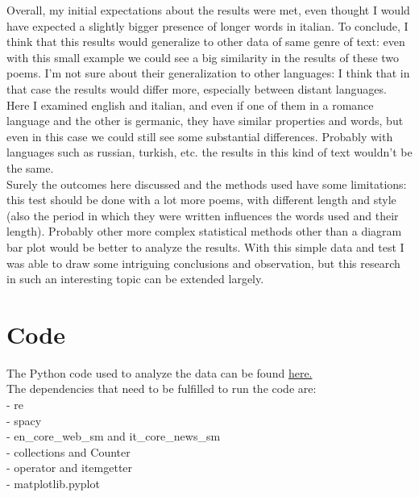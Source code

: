 Overall, my initial expectations about the results were met, even thought I would have expected a slightly bigger presence of longer words in italian. 
To conclude, I think that this results would generalize to other data of same genre of text: even with this small example we could see a  big similarity in the results of these two poems. 
I'm not sure about their generalization to other languages: I think that in that case the results would differ more, especially between distant languages. 
Here I examined english and italian, and even if one of them in a romance language and the other is germanic, they have similar properties and words, but even in this case we could still see some substantial differences. 
Probably with languages such as russian, turkish, etc. the results in this kind of text wouldn't be the same.\\
Surely the outcomes here discussed and the methods used have some limitations: this test should be done with a lot more poems, with different length and style (also the period in which they were written influences the words used and their length).
Probably other more complex statistical methods other than a diagram bar plot would be better to analyze the results. 
With this simple data and test I was able to draw some intriguing conclusions and observation, but this research in such an interesting topic can be extended largely. 

\section{Code}
The Python code used to analyze the data can be found \href{https://github.com/emmafranchino/nlp_assignments/blob/main/exercise_one/exercise_one_code.ipynb}{here.}\\
The dependencies that need to be fulﬁlled to run the code are:\\
- re\\
- spacy\\
- en\_core\_web\_sm and it\_core\_news\_sm\\
- collections and Counter\\
- operator and itemgetter\\
- matplotlib.pyplot
